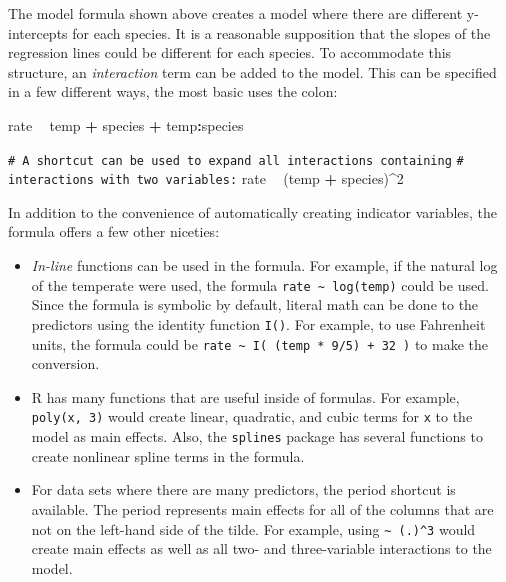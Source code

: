 \documentclass[11pt]{book}
\newenvironment{Shaded}{\begin{snugshade}}{\end{snugshade}}
\newcommand{\CommentTok}[1]{\textcolor[rgb]{0.56,0.35,0.01}{\textit{#1}}}
\newcommand{\DecValTok}[1]{\textcolor[rgb]{0.00,0.00,0.81}{#1}}
\newcommand{\NormalTok}[1]{#1}
\newcommand{\OperatorTok}[1]{\textcolor[rgb]{0.81,0.36,0.00}{\textbf{#1}}}
\newcommand{\StringTok}[1]{\textcolor[rgb]{0.31,0.60,0.02}{#1}}
\renewcommand{\CommentTok}[1]{\textcolor[rgb]{0.41,0.41,0.41}{\texttt{#1}}}
\begin{document}
The model formula shown above creates a model where there are different y-intercepts for each species. It is a reasonable supposition that the slopes of the regression lines could be different for each species. To accommodate this structure, an \emph{interaction} term can be added to the model. This can be specified in a few different ways, the most basic uses the colon:

\begin{Shaded}
\begin{Highlighting}[]
\NormalTok{rate }\OperatorTok{~}\StringTok{ }\NormalTok{temp }\OperatorTok{+}\StringTok{ }\NormalTok{species }\OperatorTok{+}\StringTok{ }\NormalTok{temp}\OperatorTok{:}\NormalTok{species}

\CommentTok{# A shortcut can be used to expand all interactions containing}
\CommentTok{# interactions with two variables:}
\NormalTok{rate }\OperatorTok{~}\StringTok{ }\NormalTok{(temp }\OperatorTok{+}\StringTok{ }\NormalTok{species)}\OperatorTok{^}\DecValTok{2}
\end{Highlighting}
\end{Shaded}

In addition to the convenience of automatically creating indicator variables, the formula offers a few other niceties:

\begin{itemize}
\item
  \emph{In-line} functions can be used in the formula. For example, if the natural log of the temperate were used, the formula \texttt{rate\ \textasciitilde{}\ log(temp)} could be used. Since the formula is symbolic by default, literal math can be done to the predictors using the identity function \texttt{I()}. For example, to use Fahrenheit units, the formula could be \texttt{rate\ \textasciitilde{}\ I(\ (temp\ *\ 9/5)\ +\ 32\ )} to make the conversion.
\item
  R has many functions that are useful inside of formulas. For example, \texttt{poly(x,\ 3)} would create linear, quadratic, and cubic terms for \texttt{x} to the model as main effects. Also, the \texttt{splines} package has several functions to create nonlinear spline terms in the formula.
\item
  For data sets where there are many predictors, the period shortcut is available. The period represents main effects for all of the columns that are not on the left-hand side of the tilde. For example, using \texttt{\textasciitilde{}\ (.)\^{}3} would create main effects as well as all two- and three-variable interactions to the model.
\end{itemize}
\end{document}
